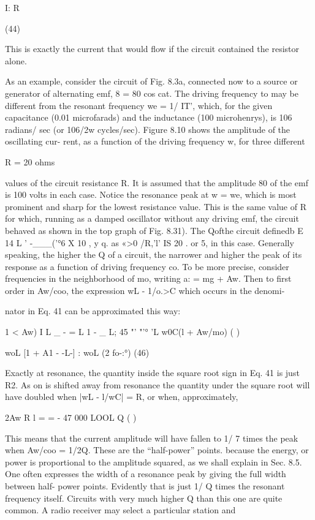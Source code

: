 I: R

(44)

This is exactly the current that would flow if the circuit contained
the resistor alone.

As an example, consider the circuit of Fig. 8.3a, connected now
to a source or generator of alternating emf, 8 = 80 cos cat. The driving
frequency to may be different from the resonant frequency
we = 1/ \/IT', which, for the given capacitance (0.01 microfarads)
and the inductance (100 microhenrys), is 106 radians/ sec (or 106/2w
cycles/sec). Figure 8.10 shows the amplitude of the oscillating cur-
rent, as a function of the driving frequency w, for three different

R = 20 ohms

values of the circuit resistance R. It is assumed that the amplitude 80
of the emf is 100 volts in each case. Notice the resonance peak at
w = we, which is most prominent and sharp for the lowest resistance
value. This is the same value of R for which, running as a damped
oscillator without any driving emf, the circuit behaved as shown in
the top graph of Fig. 8.31).
The Qofthe circuit definedb E 14 L ' -___('°6 X 10%
, y q. as «>0 /R,'l' IS 20 .
or 5, in this case. Generally speaking, the higher the Q of a circuit,
the narrower and higher the peak of its response as a function of
driving frequency co. To be more precise, consider frequencies in
the neighborhood of mo, writing a: = mg + Aw. Then to first order
in Aw/coo, the expression wL - 1/o.>C which occurs in the denomi-

nator in Eq. 41 can be approximated this way:

\begin{equation}
\end{equation}
1 < Aw) I
L _ - = L 1 - _ L; 45
"' "'° 'L w0C(l + Aw/mo) ( )

woL [1 + A1 - -L-] : woL (2 fo-:°) (46)

Exactly at resonance, the quantity inside the square root sign in
Eq. 41 is just R2. As on is shifted away from resonance the quantity
under the square root will have doubled when |wL - l/wC| = R,
or when, approximately,

\begin{equation}
\end{equation}
2Aw R l
= = - 47
000 LOOL Q ( )

This means that the current amplitude will have fallen to 1/ \/7 times
the peak when Aw/coo = 1/2Q. These are the ``half-power'' points.
because the energy, or power is proportional to the amplitude
squared, as we shall explain in Sec. 8.5. One often expresses the
width of a resonance peak by giving the full width between half-
power points. Evidently that is just 1/ Q times the resonant frequency
itself. Circuits with very much higher Q than this one are
quite common. A radio receiver may select a particular station and

